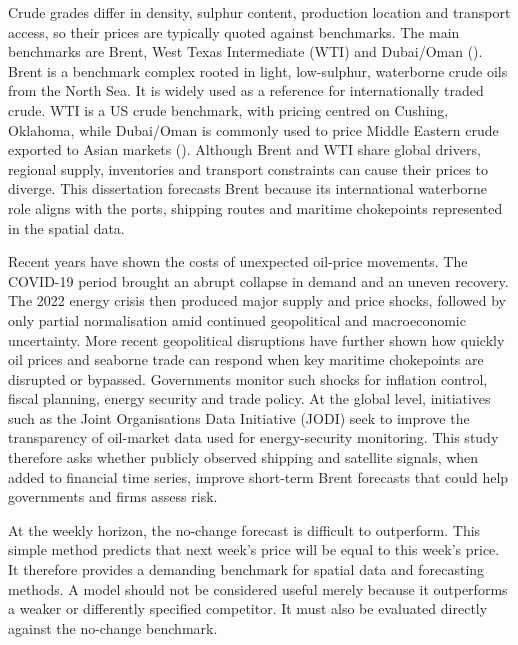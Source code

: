 \documentclass[
  british,
  12pt,
  oneside]{book}
\begin{document}
Crude grades differ in density, sulphur content, production location and transport access, so their prices are typically quoted against benchmarks. The main benchmarks are Brent, West Texas Intermediate (WTI) and Dubai/Oman (). Brent is a benchmark complex rooted in light, low-sulphur, waterborne crude oils from the North Sea. It is widely used as a reference for internationally traded crude. WTI is a US crude benchmark, with pricing centred on Cushing, Oklahoma, while Dubai/Oman is commonly used to price Middle Eastern crude exported to Asian markets (). Although Brent and WTI share global drivers, regional supply, inventories and transport constraints can cause their prices to diverge. This dissertation forecasts Brent because its international waterborne role aligns with the ports, shipping routes and maritime chokepoints represented in the spatial data.

Recent years have shown the costs of unexpected oil-price movements. The COVID-19 period brought an abrupt collapse in demand and an uneven recovery. The 2022 energy crisis then produced major supply and price shocks, followed by only partial normalisation amid continued geopolitical and macroeconomic uncertainty. More recent geopolitical disruptions have further shown how quickly oil prices and seaborne trade can respond when key maritime chokepoints are disrupted or bypassed. Governments monitor such shocks for inflation control, fiscal planning, energy security and trade policy. At the global level, initiatives such as the Joint Organisations Data Initiative (JODI) seek to improve the transparency of oil-market data used for energy-security monitoring. This study therefore asks whether publicly observed shipping and satellite signals, when added to financial time series, improve short-term Brent forecasts that could help governments and firms assess risk.

At the weekly horizon, the no-change forecast is difficult to outperform. This simple method predicts that next week's price will be equal to this week's price. It therefore provides a demanding benchmark for spatial data and forecasting methods. A model should not be considered useful merely because it outperforms a weaker or differently specified competitor. It must also be evaluated directly against the no-change benchmark.
\end{document}
